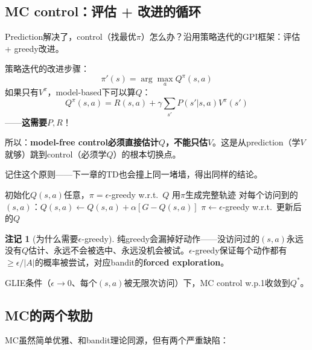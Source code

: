 \documentclass[11pt,a4paper]{article}
\theoremstyle{definition}
\newtheorem{remark}{注记}[section]
\begin{document}
\subsection{MC control：评估 + 改进的循环}

Prediction解决了，control（找最优$\pi$）怎么办？沿用策略迭代的GPI框架：评估 + greedy改进。

\begin{plainwords}
策略迭代的改进步骤：
\[
\pi'(s) = \arg\max_a Q^\pi(s,a)
\]
如果只有$V^\pi$，model-based下可以算$Q$：
\[
Q^\pi(s,a) = R(s,a) + \gamma\sum_{s'} P(s'|s,a)V^\pi(s')
\]
——\textbf{这需要$P, R$}！

所以：\textbf{model-free control必须直接估计$Q$，不能只估$V$}。这是从prediction（学$V$就够）跳到control（必须学$Q$）的根本切换点。

记住这个原则——下一章的TD也会撞上同一堵墙，得出同样的结论。
\end{plainwords}

\begin{algorithm}[H]
\caption{MC Control（$\epsilon$-greedy版）}
\begin{algorithmic}[1]
\State 初始化$Q(s,a)$任意，$\pi = \epsilon$-greedy w.r.t.\ $Q$
    \State 用$\pi$生成完整轨迹
    \State 对每个访问到的$(s,a)$：$Q(s,a) \leftarrow Q(s,a) + \alpha[G - Q(s,a)]$
    \State $\pi \leftarrow \epsilon$-greedy w.r.t.\ 更新后的$Q$
\EndFor
\end{algorithmic}
\end{algorithm}

\begin{remark}[为什么需要$\epsilon$-greedy]
纯greedy会漏掉好动作——没访问过的$(s,a)$永远没有$Q$估计、永远不会被选中、永远没机会被试。$\epsilon$-greedy保证每个动作都有$\geq \epsilon/|A|$的概率被尝试，对应bandit的\textbf{forced exploration}。

GLIE条件（$\epsilon \to 0$、每个$(s,a)$被无限次访问）下，MC control w.p.1收敛到$Q^*$。
\end{remark}

\subsection{MC的两个软肋}

MC虽然简单优雅、和bandit理论同源，但有两个严重缺陷：
\end{document}
